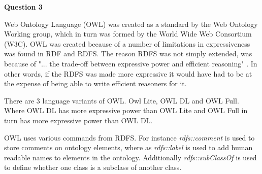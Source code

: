 \documentclass[12pt,a4paper]{article}
\begin{document}
\textbf{Question 3}
\newline

Web Ontology Language (OWL) was created as a standard by the Web Ontology Working group, which in turn  was formed by the World Wide Web Consortium (W3C). \cite{Grau2008} OWL was created because of a number of limitations in expressiveness was found in RDF and RDFS. The reason RDFS was not simply extended, was because of "... the trade-off between expressive power and efficient reasoning" \cite{Staab2009}. In other words, if the RDFS was made more expressive it would have had to be at the expense of being able to write efficient reasoners for it.

There are 3 language variants of OWL. Owl Lite, OWL DL and OWL Full. Where OWL DL has more expressive power than OWL Lite and OWL Full in turn has more expressive power than OWL DL. \citep{Patel}

OWL uses various commands from RDFS. For instance \emph{rdfs::comment} is used to store comments on ontology elements, where as \emph{rdfs::label} is used to add human readable names to elements in the ontology. \citep{Horridge2011} Additionally \emph{rdfs::subClassOf} is used to define whether one class is a subclass of another class. \citep{Staab2009}
\end{document}

